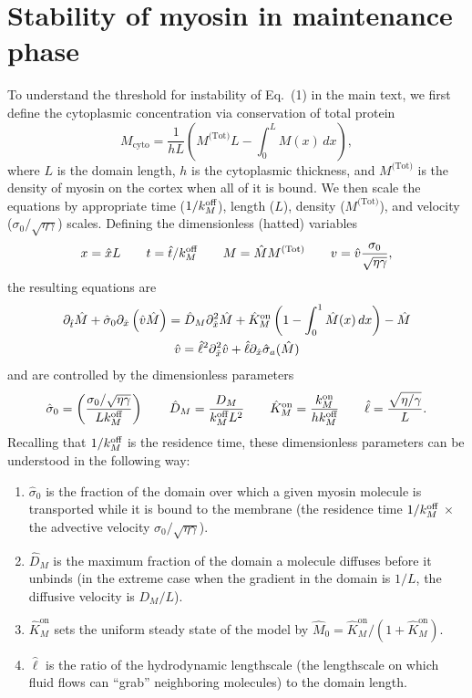 \documentclass[11pt]{article}
\newcommand{\6}[1]{#1_{\text{6}}}
\newcommand{\3}[1]{#1_{\text{3}}}
\newcommand{\Tot}[1]{#1^\text{(Tot)}}
\newcommand{\My}[1]{#1_M}
\begin{document}
\section{Stability of myosin in maintenance phase \label{sec:myosin}}
To understand the threshold for instability of Eq.\ (1) in the main text, we first define the cytoplasmic concentration via conservation of total protein
\begin{equation}
M_\text{cyto} = \frac{1}{hL}\left(\Tot{M}L-\int_0^L M(x) \, dx\right),
\end{equation}
where $L$ is the domain length, $h$ is the cytoplasmic thickness, and $\Tot{M}$ is the density of myosin on the cortex when all of it is bound. We then scale the equations by appropriate time ($1/\My{\koff}$), length ($L$), density ($\Tot{M}$), and velocity ($\sigma_0/\sqrt{\eta \gamma}$) scales. Defining the dimensionless (hatted) variables
\begin{equation}
\label{eq:NDD}
x = \hat{x} L \qquad t= \hat{t}/\My{\koff} \qquad M= \hat{M}\Tot{M} \qquad v = \hat{v} \frac{\sigma_0}{\sqrt{\eta \gamma}},
\end{equation}
the resulting equations are 
\begin{subequations}
\label{eq:MyosinEqs}
\begin{gather}
\label{eq:MND}
\partial_{\hat{t}} \hat{M} +\hat{\sigma}_0  \partial_{\hat{x}} \left(\hat{v} \hat{M} \right) =\hat{D}_M \partial_{\hat{x}}^2 \hat{M} +\hat{K}^\text{on}_M \left(1-\int_0^1  \hat{M}(x) \, dx\right) - \hat{M}\\
\label{eq:MVND}
\hat{v} = \hat{\ell}^2 \partial_{\hat{x}}^2 \hat v +\hat{\ell} \partial_{\hat{x}} \hat{\sigma}_a(\hat{M})
 \end{gather}
\end{subequations}
and are controlled by the dimensionless parameters 
\begin{equation}
\label{eq:NDparams}
\hat{\sigma}_0 = \left(\frac{\sigma_0/ \sqrt{\eta \gamma} }{L \My{\koff}}\right)   \qquad \hat{D}_M =\frac{D_M}{\My{\koff}  L^2} \qquad \hat{K}^\text{on}_M= \frac{\My{\kon}}{h \My{\koff}} \qquad \hat{\ell} = \frac{\sqrt{\eta/\gamma}}{L}.
\end{equation}
Recalling that $1/\My{\koff}$ is the residence time, these dimensionless parameters can be understood in the following way: 
\begin{enumerate}
\item $\hat{\sigma}_0$ is the fraction of the domain over which a given myosin molecule is transported while it is bound to the membrane (the residence time $1/\My{\koff}$ $\times$ the advective velocity $\sigma_0 / \sqrt{\eta \gamma}$).
\item $\hat{D}_M$ is the maximum fraction of the domain a molecule diffuses before it unbinds (in the extreme case when the gradient in the domain is $1/L$, the diffusive velocity is $D_M/L$). 
\item $\hat{K}^\text{on}_M$ sets the uniform steady state of the model by $\hat{M}_0= \hat{K}^\text{on}_M/\left(1+\hat{K}^\text{on}_M\right)$.
\item $\hat{\ell}$ is the ratio of the hydrodynamic lengthscale (the lengthscale on which fluid flows can ``grab'' neighboring molecules) to the domain length.
\end{enumerate}
\end{document}

